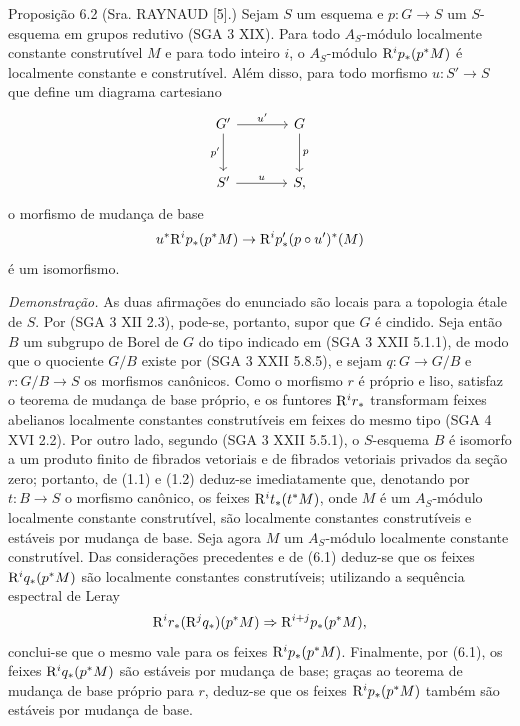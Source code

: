 \begin{statement}{Proposição 6.2}
(Sra. RAYNAUD [5].) Sejam $S$ um esquema e $p:G\to S$ um $S$-esquema em grupos redutivo (SGA 3 XIX). Para todo $A_S$-módulo localmente constante construtível $M$ e para todo inteiro $i$, o $A_S$-módulo $\mathrm{R}^ip_*(p^*M)$ é localmente constante e construtível. Além disso, para todo morfismo $u:S'\to S$ que define um diagrama cartesiano
\[
\begin{tikzcd}[column sep=large,row sep=large]
G' \arrow[r,"u'"] \arrow[d,"p'"'] & G \arrow[d,"p"]\\
S' \arrow[r,"u"] & S,
\end{tikzcd}
\]
o morfismo de mudança de base
\[
u^*\mathrm{R}^ip_*(p^*M)\to \mathrm{R}^ip'_*(p\circ u')^*(M)
\]
é um isomorfismo.
\end{statement}

\emph{Demonstração.} As duas afirmações do enunciado são locais para a topologia étale de $S$. Por (SGA 3 XII 2.3), pode-se, portanto, supor que $G$ é cindido. Seja então $B$ um subgrupo de Borel de $G$ do tipo indicado em (SGA 3 XXII 5.1.1), de modo que o quociente $G/B$ existe por (SGA 3 XXII 5.8.5), e sejam $q:G\to G/B$ e $r:G/B\to S$ os morfismos canônicos. Como o morfismo $r$ é próprio e liso, satisfaz o teorema de mudança de base próprio, e os funtores $\mathrm{R}^ir_*$ transformam feixes abelianos localmente constantes construtíveis em feixes do mesmo tipo (SGA 4 XVI 2.2). Por outro lado, segundo (SGA 3 XXII 5.5.1), o $S$-esquema $B$ é isomorfo a um produto finito de fibrados vetoriais e de fibrados vetoriais privados da seção zero; portanto, de (1.1) e (1.2) deduz-se imediatamente que, denotando por $t:B\to S$ o morfismo canônico, os feixes $\mathrm{R}^it_*(t^*M)$, onde $M$ é um $A_S$-módulo localmente constante construtível, são localmente constantes construtíveis e estáveis por mudança de base. Seja agora $M$ um $A_S$-módulo localmente constante construtível. Das considerações precedentes e de (6.1) deduz-se que os feixes $\mathrm{R}^iq_*(p^*M)$ são localmente constantes construtíveis; utilizando a sequência espectral de Leray
\[
\mathrm{R}^ir_*(\mathrm{R}^jq_*)(p^*M)\Rightarrow \mathrm{R}^{i+j}p_*(p^*M),
\]
conclui-se que o mesmo vale para os feixes $\mathrm{R}^ip_*(p^*M)$. Finalmente, por (6.1), os feixes $\mathrm{R}^iq_*(p^*M)$ são estáveis por mudança de base; graças ao teorema de mudança de base próprio para $r$, deduz-se que os feixes $\mathrm{R}^ip_*(p^*M)$ também são estáveis por mudança de base.
